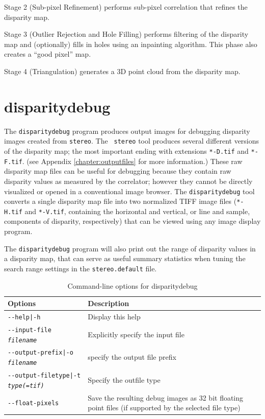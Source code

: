 Stage 2 (Sub-pixel Refinement) performs sub-pixel correlation that
refines the disparity map.

Stage 3 (Outlier Rejection and Hole Filling) performs filtering of the
disparity map and (optionally) fills in holes using an inpainting
algorithm.  This phase also creates a ``good pixel'' map.

Stage 4 (Triangulation) generates a 3D point cloud from the disparity
map.

\section{disparitydebug}
\label{disparitydebug}

The \texttt{disparitydebug} program produces output images for
debugging disparity images created from \verb#stereo#. The {\tt
stereo} tool produces several different versions of the disparity
map; the most important ending with extensions \verb#*-D.tif# and
\verb#*-F.tif#. (see Appendix \ref{chapter:outputfiles} for more
information.)  These raw disparity map files can be useful for
debugging because they contain raw disparity values as measured by
the correlator; however they cannot be directly visualized or opened
in a conventional image browser.  The \verb#disparitydebug# tool
converts a single disparity map file into two normalized TIFF image
files (\verb#*-H.tif# and \verb#*-V.tif#, containing the horizontal
and vertical, or line and sample, components of disparity, respectively)
that can be viewed using any image display program.

The {\tt disparitydebug} program will also print out the range of
disparity values in a disparity map, that can serve as useful summary
statistics when tuning the search range settings in the
{\tt stereo.default} file.

\begin{longtable}{|l|p{10cm}|}
\caption{Command-line options for disparitydebug}
\label{tbl:disparitydebug}
\endfirsthead
\endhead
\endfoot
\endlastfoot
\hline
Options & Description \\ \hline \hline
\texttt{-\/-help|-h} & Display this help\\ \hline
\texttt{-\/-input-file \textit{filename}} & Explicitly specify the input file \\ \hline
\texttt{-\/-output-prefix|-o \textit{filename}} & specify the output file prefix \\ \hline
\texttt{-\/-output-filetype|-t \textit{type(=tif)}} & Specify the outfile type \\ \hline
\texttt{-\/-float-pixels} & Save the resulting debug images as 32 bit floating point files (if supported by the selected file type) \\ \hline
\end{longtable}

